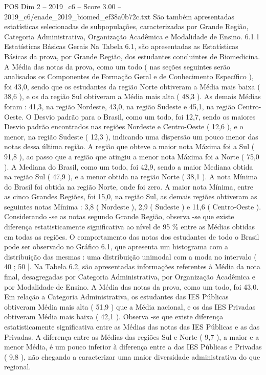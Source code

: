 \begin{textsample}{POS Dim 2 – 2019\_c6 – Score 3.00 – 2019\_c6/enade\_2019\_biomed\_ef38a0b72c.txt}
São também apresentadas estatísticas selecionadas de subpopulações, caracterizadas por Grande Região, Categoria Administrativa, Organização Acadêmica e Modalidade de Ensino. 6.1.1 Estatísticas Básicas Gerais Na Tabela 6.1, são apresentadas as Estatísticas Básicas da prova, por Grande Região, dos estudantes concluintes de Biomedicina.
A Média das notas da prova, como um todo ( nas seções seguintes serão analisados os Componentes de Formação Geral e de Conhecimento Específico ), foi 43,0, sendo que os estudantes da região Norte obtiveram a Média mais baixa ( 38,6 ), e os da região Sul obtiveram a Média mais alta ( 48,3 ).
As demais Médias foram : 41,3, na região Nordeste, 43,0, na região Sudeste e 45,1, na região Centro-Oeste.
O Desvio padrão para o Brasil, como um todo, foi 12,7, sendo os maiores Desvio padrão encontrados nas regiões Nordeste e Centro-Oeste ( 12,6 ), e o menor, na região Sudeste ( 12,3 ), indicando uma dispersão um pouco menor das notas dessa última região.
A região que obteve a maior nota Máxima foi a Sul ( 91,8 ), ao passo que a região que atingiu a menor nota Máxima foi a Norte ( 75,0 ).
A Mediana do Brasil, como um todo, foi 42,9, sendo a maior Mediana obtida na região Sul ( 47,9 ), e a menor obtida na região Norte ( 38,1 ).
A nota Mínima do Brasil foi obtida na região Norte, onde foi zero.
A maior nota Mínima, entre as cinco Grandes Regiões, foi 15,0, na região Sul, as demais regiões obtiveram as seguintes notas Mínima : 3,8 ( Nordeste ), 2,9 ( Sudeste ) e 11,6 ( Centro-Oeste ).
Considerando -se as notas segundo Grande Região, observa -se que existe diferença estatisticamente significativa ao nível de 95 \% entre as Médias obtidas em todas as regiões.
O comportamento das notas dos estudantes de todo o Brasil pode ser observado no Gráfico 6.1, que apresenta um histograma com a distribuição das mesmas : uma distribuição unimodal com a moda no intervalo ( 40 ; 50 ].
Na Tabela 6.2, são apresentadas informações referentes à Média da nota final, desagregadas por Categoria Administrativa, por Organização Acadêmica e por Modalidade de Ensino.
A Média das notas da prova, como um todo, foi 43,0.
Em relação a Categoria Administrativa, os estudantes das IES Públicas obtiveram Média mais alta ( 51,9 ) que a Média nacional, e os das IES Privadas obtiveram Média mais baixa ( 42,1 ).
Observa -se que existe diferença estatisticamente significativa entre as Médias das notas das IES Públicas e as das Privadas.
A diferença entre as Médias das regiões Sul e Norte ( 9,7 ), a maior e a menor Média, é um pouco inferior à diferença entre a das IES Públicas e Privadas ( 9,8 ), não chegando a caracterizar uma maior diversidade administrativa do que regional.

\end{textsample}
